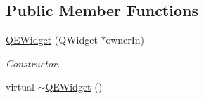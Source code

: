 \subsection*{Public Member Functions}
\begin{DoxyCompactItemize}
\item 
\hypertarget{classQEWidget_a46ee3e2ec7abf3f7d95aa2038e56e044}{
\hyperlink{classQEWidget_a46ee3e2ec7abf3f7d95aa2038e56e044}{QEWidget} (QWidget $\ast$ownerIn)}
\label{classQEWidget_a46ee3e2ec7abf3f7d95aa2038e56e044}

\begin{DoxyCompactList}\small\item\em Constructor. \end{DoxyCompactList}\item 
\hypertarget{classQEWidget_a391db1f9d84191b801a4914d42ada1b8}{
virtual \hyperlink{classQEWidget_a391db1f9d84191b801a4914d42ada1b8}{$\sim$QEWidget} ()}
\label{classQEWidget_a391db1f9d84191b801a4914d42ada1b8}


\end{DoxyCompactItemize}
